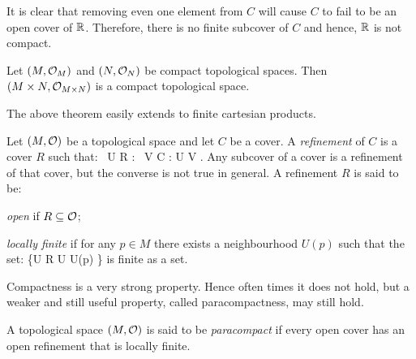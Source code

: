 \begin{figure}[h!]
\centering
{}
\end{figure}

It is clear that removing even one element from $C$ will cause $C$ to fail to be an open cover of $\mathbb{R}$. Therefore, there is no finite subcover of $C$ and hence, $\mathbb{R}$ is not compact.
\ee

\bt
Let $(M,\mathcal{O}_M)$ and $(N,\mathcal{O}_N)$ be compact topological spaces. Then $(M\times N,\mathcal{O}_{M\times N})$ is a compact topological space.
\et

The above theorem easily extends to finite cartesian products. 

\bd
Let $(M,\mathcal{O})$ be a topological space and let $C$ be a cover. A \emph{refinement} of $C$ is a cover $R$ such that:
\bse
\forall \, U \in R : \exists \, V \in C : U \se V .
\ese
\ed
Any subcover of a cover is a refinement of that cover, but the converse is not true in general. A refinement $R$ is said to be:
\bit
\item \emph{open} if $R\subseteq \mathcal{O}$;
\item \emph{locally finite} if for any $p\in M$ there exists a neighbourhood $U(p)$ such that the set:
\bse
\{U \in R \mid U \cap U(p) \neq \vn\}
\ese
is finite as a set.
\eit

Compactness is a very strong property. Hence often times it does not hold, but a weaker and still useful property, called paracompactness, may still hold.

\bd
A topological space $(M,\mathcal{O})$ is said to be \emph{paracompact} if every open cover has an open refinement that is locally finite.
\ed

